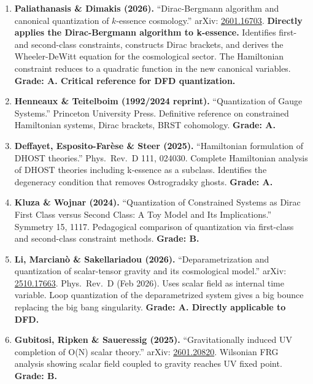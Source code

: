 \documentclass[11pt,a4paper]{article}
\begin{document}
\begin{enumerate}
\item \textbf{Paliathanasis \& Dimakis (2026).} ``Dirac-Bergmann algorithm and canonical quantization of $k$-essence cosmology.'' arXiv: \href{https://arxiv.org/abs/2601.16703}{2601.16703}. \textbf{Directly applies the Dirac-Bergmann algorithm to k-essence.} Identifies first- and second-class constraints, constructs Dirac brackets, and derives the Wheeler-DeWitt equation for the cosmological sector. The Hamiltonian constraint reduces to a quadratic function in the new canonical variables. \textbf{Grade: A. Critical reference for DFD quantization.}

\item \textbf{Henneaux \& Teitelboim (1992/2024 reprint).} ``Quantization of Gauge Systems.'' Princeton University Press. Definitive reference on constrained Hamiltonian systems, Dirac brackets, BRST cohomology. \textbf{Grade: A.}

\item \textbf{Deffayet, Esposito-Far\`{e}se \& Steer (2025).} ``Hamiltonian formulation of DHOST theories.'' Phys.\ Rev.\ D 111, 024030. Complete Hamiltonian analysis of DHOST theories including k-essence as a subclass. Identifies the degeneracy condition that removes Ostrogradsky ghosts. \textbf{Grade: A.}

\item \textbf{Kluza \& Wojnar (2024).} ``Quantization of Constrained Systems as Dirac First Class versus Second Class: A Toy Model and Its Implications.'' Symmetry 15, 1117. Pedagogical comparison of quantization via first-class and second-class constraint methods. \textbf{Grade: B.}

\item \textbf{Li, Marcian\`{o} \& Sakellariadou (2026).} ``Deparametrization and quantization of scalar-tensor gravity and its cosmological model.'' arXiv: \href{https://arxiv.org/abs/2510.17663}{2510.17663}. Phys.\ Rev.\ D (Feb 2026). Uses scalar field as internal time variable. Loop quantization of the deparametrized system gives a big bounce replacing the big bang singularity. \textbf{Grade: A. Directly applicable to DFD.}

\item \textbf{Gubitosi, Ripken \& Saueressig (2025).} ``Gravitationally induced UV completion of O(N) scalar theory.'' arXiv: \href{https://arxiv.org/abs/2601.20820}{2601.20820}. Wilsonian FRG analysis showing scalar field coupled to gravity reaches UV fixed point. \textbf{Grade: B.}
\end{enumerate}
\end{document}
